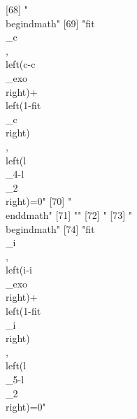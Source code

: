 [68] "\\begin{dmath}"                                                                                                                                                                                                                                                                                
[69] "{{fit\\_c}}\\, \\left({c}-{{c\\_exo}}\\right)+\\left(1-{{fit\\_c}}\\right)\\, \\left({{l\\_4}}-{{l\\_2}}\\right)=0"                                                                                                                                                                            
[70] "\\end{dmath}"                                                                                                                                                                                                                                                                                  
[71] ""                                                                                                                                                                                                                                                                                              
[72] "%
[73] "\\begin{dmath}"                                                                                                                                                                                                                                                                                
[74] "{{fit\\_i}}\\, \\left({i}-{{i\\_exo}}\\right)+\\left(1-{{fit\\_i}}\\right)\\, \\left({{l\\_5}}-{{l\\_2}}\\right)=0"                                                                                                                                                                            
